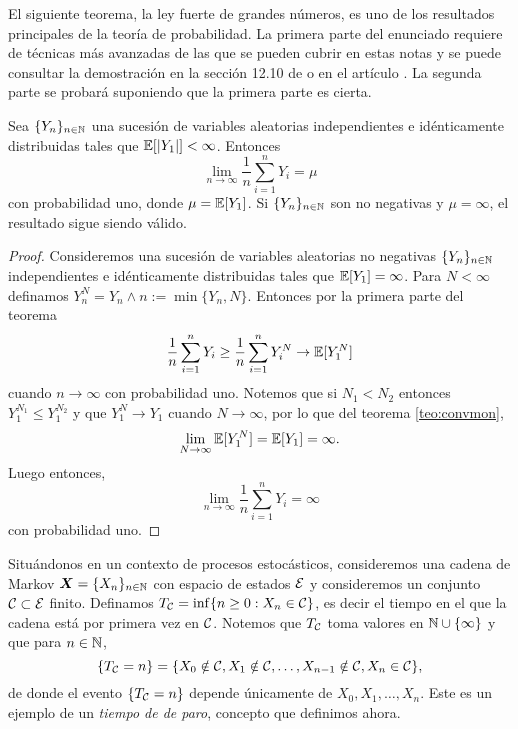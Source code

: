 El siguiente teorema, la ley fuerte de grandes números, es uno de los resultados principales de la teoría de probabilidad. La primera parte del enunciado requiere de técnicas más avanzadas de las que se pueden cubrir en estas notas y se puede consultar la demostración en la sección 12.10 de \cite{Williams91} o en el artículo \cite{Etemadi81}. La segunda parte se probará suponiendo que la primera parte es cierta.

\begin{theorem} \label{teo:lfgn}
    Sea $\{Y_n\}_{n \in \mathbb{N}}$ una sucesión de variables aleatorias independientes e idénticamente distribuidas tales que $\mathbb{E}[\left\lvert Y_1 \right\rvert] < \infty$. Entonces 
    \[
    \lim_{n \to \infty} \frac{1}{n} \sum_{i = 1}^n Y_i = \mu
    \]
    con probabilidad uno, donde $\mu = \mathbb{E}[Y_1]$. Si $\{Y_n\}_{n \in \mathbb{N}}$ son no negativas y $\mu = \infty$, el resultado sigue siendo válido.
\end{theorem}

\begin{proof}
    Consideremos una sucesión de variables aleatorias no negativas $\{Y_n\}_{n \in \mathbb{N}}$ independientes e idénticamente distribuidas tales que $\mathbb{E}[Y_1] = \infty$. Para $N < \infty$ definamos $Y_n^N = Y_n \wedge n := \min\{Y_n, N\}$. Entonces por la primera parte del teorema 
    \[
        \frac 1 n \sum_{i = 1}^n Y_i \geq \frac 1 n \sum_{i = 1}^n Y_i^N \to \mathbb{E}[Y_1^N]
    \]
    cuando $n \to \infty$ con probabilidad uno. Notemos que si $N_1 < N_2$ entonces $Y_1^{N_1} \leq Y_1^{N_2}$ y que $Y_{1}^N \to Y_1$ cuando $N \to \infty$, por lo que del teorema \ref{teo:convmon},
    \[
        \lim_{N \to \infty} \mathbb{E}[Y_1^N] = \mathbb{E}[Y_1] = \infty.    
    \]
    Luego entonces,
    \[
        \lim_{n \to \infty} \frac{1}{n} \sum_{i = 1}^n Y_i = \infty
    \]
    con probabilidad uno.
\end{proof}

Situándonos en un contexto de procesos estocásticos, consideremos una cadena de Markov $\bm X = \{X_n\}_{n \in \mathbb{N}}$ con espacio de estados $\mathcal{E}$ y consideremos un conjunto $\mathcal{C} \subset \mathcal{E}$ finito. Definamos $T_{\mathcal{C}} = \inf\{n \geq 0 : X_n \in \mathcal{C}\}$, es decir el tiempo en el que la cadena está por primera vez en $\mathcal{C}$. Notemos que $T_{\mathcal{C}}$ toma valores en $\mathbb{N} \cup \{\infty\}$ y que para $n \in \mathbb{N}$, 
\[
    \{T_{\mathcal{C}} = n\} = \{X_0 \notin \mathcal{C}, X_1 \notin \mathcal{C}, \ldots, X_{n-1} \notin \mathcal{C}, X_n \in \mathcal{C}\},
\]
de donde el evento $\{T_{\mathcal{C}} = n\}$ depende únicamente de $X_0, X_1, \ldots, X_n$. Este es un ejemplo de un \emph{tiempo de de paro}, concepto que definimos ahora.


